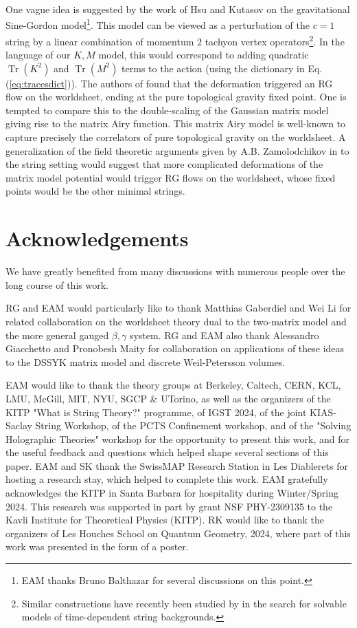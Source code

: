 \documentclass[english]{article}
\DeclareMathOperator{\Tr}{Tr}
\renewcommand{\>}{\rangle}
\newcommand{\<}{\langle}
\renewcommand{\(}{\left(}
\renewcommand{\)}{\right)}
\begin{document}
\begin{enumerate}
{One vague idea is suggested by the work of Hsu and Kutasov \cite{HsuKutasov} on the gravitational Sine-Gordon model\footnote{EAM thanks Bruno Balthazar for several discussions on this point.}. This model can be viewed as a perturbation of the $c=1$ string by a linear combination of momentum $2$ tachyon vertex operators\footnote{Similar constructions have recently been studied by \cite{RodriguezDefs,BalthazarDefs} in the search for solvable models of time-dependent string backgrounds.}. In the language of our $K,M$ model, this would correspond to adding quadratic $\Tr(K^2)$ and $\Tr(M^2)$ terms to the action (using the dictionary in Eq.(\ref{eq:tracesdict})). The authors of \cite{HsuKutasov} found that the deformation triggered an RG flow on the worldsheet, ending at the pure topological gravity fixed point. One is tempted to compare this to the double-scaling of the Gaussian matrix model giving rise to the matrix Airy function. This matrix Airy model is well-known to capture precisely the correlators of pure topological gravity on the worldsheet. A generalization of the field theoretic arguments given by A.B. Zamolodchikov in \cite{ZamolodchikovMinMods} to the string setting would suggest that more complicated deformations of the matrix model potential would trigger RG flows on the worldsheet, whose fixed points would be the other minimal strings.}
\end{enumerate}



\section*{Acknowledgements}

We have greatly benefited from many discussions with numerous people over the long course of this work. 

RG and EAM would particularly like to thank Matthias Gaberdiel and Wei Li for related collaboration on the worldsheet theory dual to the two-matrix model and the more general gauged $\beta,\gamma$ system. RG and EAM also thank Alessandro Giacchetto and Pronobesh Maity for collaboration on applications of these ideas to the DSSYK matrix model and discrete Weil-Petersson volumes.  

EAM would like to thank the theory groups at Berkeley, Caltech, CERN, KCL, LMU, McGill, MIT, NYU, SGCP \& UTorino, as well as the organizers of the KITP "What is String Theory?" programme, of IGST 2024, of the joint KIAS-Saclay String Workshop, of the PCTS Confinement workshop, and of the "Solving Holographic Theories" workshop for the opportunity to present this work, and for the useful feedback and questions which helped shape several sections of this paper. EAM and SK thank the SwissMAP Research Station in Les Diablerets for hosting a research stay, which helped to complete this work. EAM gratefully acknowledges the KITP in Santa Barbara for hospitality during Winter/Spring 2024. This research was supported in part by grant NSF PHY-2309135 to the Kavli Institute for Theoretical Physics (KITP). RK would like to thank the organizers of Les Houches School on Quantum Geometry, 2024, where part of this work was presented in the form of a poster.
\end{document}
